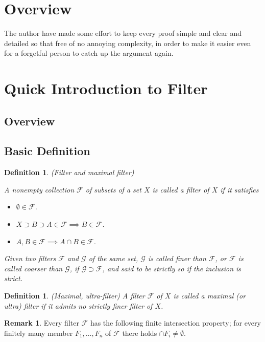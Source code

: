 \documentclass[a4paper,12pt]{article}
\newtheorem{dfn}[thm]{Definition}
\theoremstyle{remark}
\theoremstyle{definition}
\newtheorem{rem}[thm]{Remark}
\theoremstyle{definition}
\theoremstyle{definition}
\begin{document}
\section*{Overview}
The author have made some effort to keep every proof simple and clear and detailed so that free of no annoying complexity, in order to make it easier even for a forgetful person to catch up the argument again.

\section{Quick Introduction to Filter}

\subsection{Overview}

\subsection{Basic Definition}
\begin{dfn} (Filter and maximal filter)

	A nonempty collection \( \mathscr{F} \) of subsets of a set \( X \) is called a filter of \( X \) if it satisfies
	\begin{itemize}
		\item[(1)] \( \emptyset \in \mathscr{F} \).
		\item[(2)] \( X \supset B \supset A \in \mathscr{F} \implies B \in \mathscr{F}\).
		\item[(3)] \( A, B \in \mathscr{F} \implies A \cap B \in \mathscr{F}\).
	\end{itemize}

	Given two filters \( \mathscr{F} \) and \( \mathscr{G} \) of the same set, \( \mathscr{G} \) is called finer than \( \mathscr{F} \), or \( \mathscr{F} \) is called coarser than \( \mathscr{G} \), if \( \mathscr{G} \supset \mathscr{F}\), and said to be strictly so if the inclusion is strict.
\end{dfn}

\begin{dfn} (Maximal, ultra-filter)
	A filter \( \mathscr{F} \) of \( X \) is called a maximal (or ultra) filter if it admits no strictly finer filter of \( X \).
\end{dfn}

\begin{rem}
	Every filter \( \mathscr{F} \) has the following finite intersection property; for every finitely many member \( F_1 ,\ldots, F_n \) of \( \mathscr{F} \) there holds \( \cap F_i \neq \emptyset \).
\end{rem}
\end{document}
